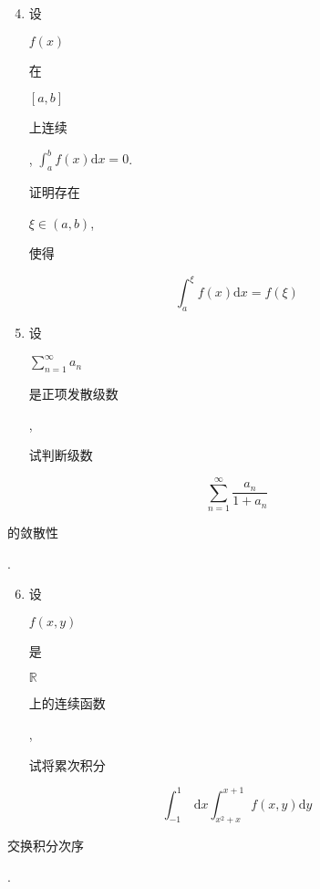 \documentclass[10pt]{article}
\begin{document}
\begin{enumerate}
  \setcounter{enumi}{3}
  \item \begin{CJK}{UTF8}{mj}设\end{CJK} $f(x)$ \begin{CJK}{UTF8}{mj}在\end{CJK} $[a, b]$ \begin{CJK}{UTF8}{mj}上连续\end{CJK}, $\int_{a}^{b} f(x) \mathrm{d} x=0$. \begin{CJK}{UTF8}{mj}证明存在\end{CJK} $\xi \in(a, b)$, \begin{CJK}{UTF8}{mj}使得\end{CJK}
\end{enumerate}
$$
\int_{a}^{\xi} f(x) \mathrm{d} x=f(\xi)
$$

\begin{enumerate}
  \setcounter{enumi}{4}
  \item \begin{CJK}{UTF8}{mj}设\end{CJK} $\sum_{n=1}^{\infty} a_{n}$ \begin{CJK}{UTF8}{mj}是正项发散级数\end{CJK}, \begin{CJK}{UTF8}{mj}试判断级数\end{CJK}
\end{enumerate}
$$
\sum_{n=1}^{\infty} \frac{a_{n}}{1+a_{n}}
$$
\begin{CJK}{UTF8}{mj}的敛散性\end{CJK}.

\begin{enumerate}
  \setcounter{enumi}{5}
  \item \begin{CJK}{UTF8}{mj}设\end{CJK} $f(x, y)$ \begin{CJK}{UTF8}{mj}是\end{CJK} $\mathbb{R}$ \begin{CJK}{UTF8}{mj}上的连续函数\end{CJK}, \begin{CJK}{UTF8}{mj}试将累次积分\end{CJK}
\end{enumerate}
$$
\int_{-1}^{1} \mathrm{~d} x \int_{x^{2}+x}^{x+1} f(x, y) \mathrm{d} y
$$
\begin{CJK}{UTF8}{mj}交换积分次序\end{CJK}.
\end{document}

